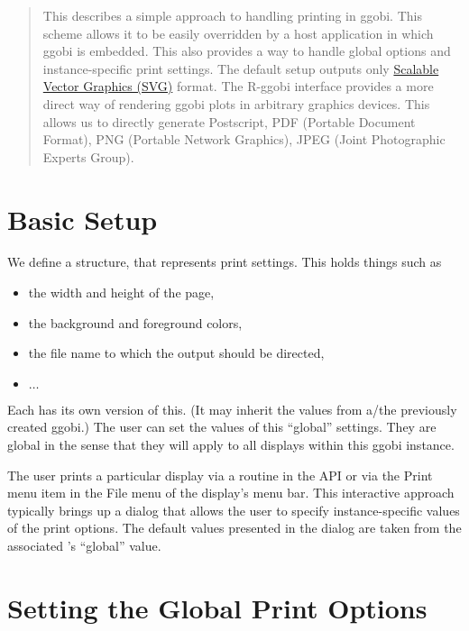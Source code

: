 \documentclass{article}
\begin{document}
\begin{abstract}

  This describes a simple approach to handling printing in ggobi. This
  scheme allows it to be easily overridden by a host application in
  which ggobi is embedded.  This also provides a way to handle global
  options and instance-specific print settings.
  The default setup outputs only \href{http://www.w3.org/Graphics/SVG}{Scalable Vector Graphics (SVG)}
  format. The R-ggobi interface provides a more direct way of
  rendering ggobi plots in arbitrary graphics devices. This allows us
  to directly generate Postscript, PDF (Portable Document Format),
  PNG (Portable Network Graphics),  JPEG (Joint Photographic Experts Group).
\end{abstract}

\section{Basic Setup}

We define a structure,  that represents print
settings.
This holds things such as 
\begin{itemize}
\item the width and height of the page,
\item the background and foreground colors,
\item the file name to which the output
should be directed,
\item $\ldots$
\end{itemize}

Each  has its own version of this.  (It may inherit
the values from a/the previously created ggobi.)  The user can set the
values of this ``global'' settings. They are global in the sense that
they will apply to all displays within this ggobi instance.

The user prints a particular display via a routine in the API or via
the Print menu item in the File menu of the display's menu bar.  This
interactive approach typically brings up a dialog that allows the user
to specify instance-specific values of the print options. The default
values presented in the dialog are taken from the associated
's ``global'' value.


\section{Setting the Global Print Options}
\end{document}
